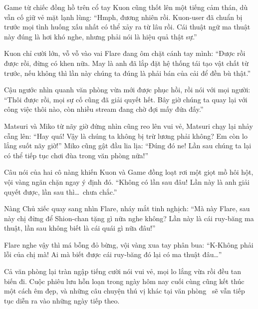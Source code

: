 \documentclass[../main.tex]{subfiles}
\begin{document}
Game từ chiếc đồng hồ trên cổ tay Kuon cũng thốt lên một tiếng cảm thán, dù vẫn cố giữ vẻ mặt lạnh lùng: ``Hmph, đương nhiên rồi. Kuon-user đã chuẩn bị trước mọi tình huống xấu nhất có thể xảy ra từ lâu rồi. Cái thuật ngữ ma thuật này đúng là hơi khó nghe, nhưng phải nói là hiệu quả thật sự.''

Kuon chỉ cười lớn, vỗ vỗ vào vai Flare đang ôm chặt cánh tay mình: ``Được rồi được rồi, đừng có khen nữa. May là anh đã lắp đặt hệ thống tái tạo vật chất từ trước, nếu không thì lần này chúng ta đúng là phải bán của cải để đền bù thật.''

Cậu ngước nhìn quanh văn phòng vừa mới được phục hồi, rồi nói với mọi người: ``Thôi được rồi, mọi sự cố cũng đã giải quyết hết. Bây giờ chúng ta quay lại với công việc thôi nào, còn nhiều stream đang chờ đợi mấy đứa đấy.''

Matsuri và Miko từ nãy giờ đứng nhìn cũng reo lên vui vẻ, Matsuri chạy lại nhảy cẫng lên: ``Hay quá! Vậy là chúng ta không bị trừ lương phải không? Em còn lo lắng suốt nãy giờ!'' Miko cũng gật đầu lia lịa: ``Đúng đó ne! Lần sau chúng ta lại có thể tiếp tục chơi đùa trong văn phòng nữa!''

Câu nói của hai cô nàng khiến Kuon và Game đồng loạt rơi một giọt mồ hôi hột, vội vàng ngăn chặn ngay ý định đó. ``Không có lần sau đâu! Lần này là anh giải quyết được, lần sau thì\dots\ chưa chắc.''

Nàng Chủ xiếc quay sang nhìn Flare, nháy mắt tinh nghịch: ``Mà này Flare, sau này chị đừng để Shion-chan tặng gì nữa nghe không? Lần này là cái ruy-băng ma thuật, lần sau không biết là cái quái gì nữa đâu!''

Flare nghe vậy thì má bỗng đỏ bừng, vội vàng xua tay phân bua: ``K-Không phải lỗi của chị mà! Ai mà biết được cái ruy-băng đó lại có ma thuật đâu\dots''

Cả văn phòng lại tràn ngập tiếng cười nói vui vẻ, mọi lo lắng vừa rồi đều tan biến đi. Cuộc phiêu lưu hỗn loạn trong ngày hôm nay cuối cùng cũng kết thúc một cách êm đẹp, và những câu chuyện thú vị khác tại văn phòng \hll\ sẽ vẫn tiếp tục diễn ra vào những ngày tiếp theo.
\end{document}

